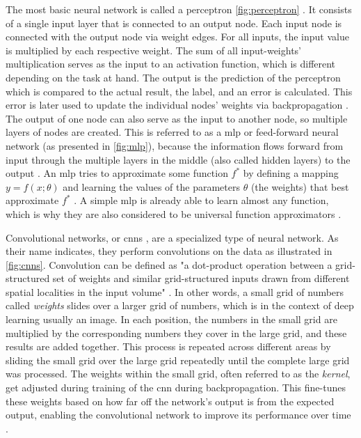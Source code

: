 The most basic neural network is called a perceptron \autoref{fig:perceptron} \cite{rosenblatt1958PerceptronProbabilisticModel}.
It consists of a single input layer that is connected to an output node.
Each input node is connected with the output node via weight edges.
For all inputs, the input value is multiplied by each respective weight.
The sum of all input-weights' multiplication serves as the input to an activation function, which is different depending on the task at hand.
The output is the prediction of the perceptron which is compared to the actual result, the label, and an error is calculated.
This error is later used to update the individual nodes' weights via backpropagation \cite{aggarwal2018NeuralNetworksDeep}.
The output of one node can also serve as the input to another node, so multiple layers of nodes are created.
This is referred to as a \gls{mlp} or feed-forward neural network (as presented in \autoref{fig:mlp}), 
because the information flows forward from input through the multiple layers in the middle (also called hidden layers) to the output \cite{aggarwal2018NeuralNetworksDeep, Goodfellow-et-al-2016}.
An \gls{mlp} tries to approximate some function $f^*$ by defining a mapping $y=f(x;\theta)$ and learning the values of the parameters $\theta$ (\ie the weights) that best approximate $f^*$ \cite{Goodfellow-et-al-2016}.
A simple \gls{mlp} is already able to learn almost any function, which is why they are also considered to be universal function approximators \cite{aggarwal2018NeuralNetworksDeep, hornik1989MultilayerFeedforwardNetworks}.

Convolutional networks, or \glspl{cnn} \cite{lecun1998GradientbasedLearningApplied}, are a specialized type of neural network.
As their name indicates, they perform convolutions on the data as illustrated in \autoref{fig:cnns}.
Convolution can be defined as "a dot-product operation between a grid-structured set of weights and similar grid-structured inputs drawn from
different spatial localities in the input volume" \cite[p. 316]{aggarwal2018NeuralNetworksDeep}.
In other words, a small grid of numbers called \textit{weights} slides over a larger grid of numbers, which is in the context of deep learning usually an image.
In each position, the numbers in the small grid are multiplied by the corresponding numbers they cover in the large grid, and these results are added together. 
This process is repeated across different areas by sliding the small grid over the large grid repeatedly until the complete large grid was processed.
The weights within the small grid, often referred to as the \textit{kernel}, get adjusted during training of the \gls{cnn} during backpropagation. 
This fine-tunes these weights based on how far off the network's output is from the expected output, enabling the convolutional network to improve its performance over time \cite{aggarwal2018NeuralNetworksDeep, Goodfellow-et-al-2016}.

